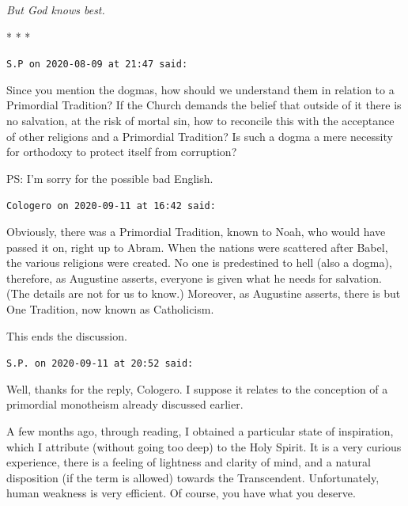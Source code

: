 \hfill

\emph{But God knows best.}




\begin{center}* * *\end{center}

\begin{footnotesize}\begin{sffamily}



\texttt{S.P on 2020-08-09 at 21:47 said: }

Since you mention the dogmas, how should we understand them in relation to a Primordial Tradition? If the Church demands the belief that outside of it there is no salvation, at the risk of mortal sin, how to reconcile this with the acceptance of other religions and a Primordial Tradition? Is such a dogma a mere necessity for orthodoxy to protect itself from corruption?

PS: I'm sorry for the possible bad English.


\hfill

\texttt{Cologero on 2020-09-11 at 16:42 said: }

Obviously, there was a Primordial Tradition, known to Noah, who would have passed it on, right up to Abram. When the nations were scattered after Babel, the various religions were created. No one is predestined to hell (also a dogma), therefore, as Augustine asserts, everyone is given what he needs for salvation. (The details are not for us to know.) Moreover, as Augustine asserts, there is but One Tradition, now known as Catholicism.

This ends the discussion.


\hfill

\texttt{S.P. on 2020-09-11 at 20:52 said: }

Well, thanks for the reply, Cologero. I suppose it relates to the conception of a primordial monotheism already discussed earlier.

A few months ago, through reading, I obtained a particular state of inspiration, which I attribute (without going too deep) to the Holy Spirit. It is a very curious experience, there is a feeling of lightness and clarity of mind, and a natural disposition (if the term is allowed) towards the Transcendent. Unfortunately, human weakness is very efficient. Of course, you have what you deserve.


\end{sffamily}\end{footnotesize}
